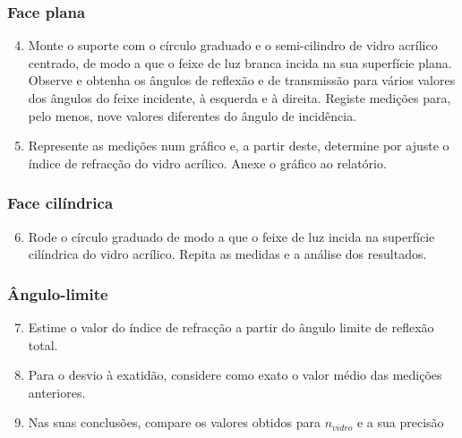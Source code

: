 \documentclass[a4paper,twoside,11pt]{report}      %
\begin{document}
\subsubsection*{\sf Face plana}
\begin{enumerate}
 \setcounter{enumi}{3}
\item Monte o suporte com o círculo graduado e o semi-cilindro  de  vidro  acrílico centrado, de modo a que o feixe de luz branca incida na sua superfície  plana.  Observe  e obtenha os ângulos de reflexão e de transmissão para vários valores dos ângulos do feixe incidente, à esquerda e à direita.  Registe medições  para, pelo  menos,  nove  valores  diferentes  do ângulo de incidência.
\item Represente as medições num gráfico e, a partir deste, determine por ajuste o índice de refracção do vidro acrílico.  Anexe o gráfico ao relatório.
\end{enumerate}

\subsubsection*{\sf Face cilíndrica}
\begin{enumerate}
 \setcounter{enumi}{5}
\item Rode o círculo graduado de modo a que o feixe de luz incida na  superfície cilíndrica do vidro acrílico. Repita  as  medidas  e  a  análise  dos  resultados. 
\end{enumerate}

\subsubsection*{\sf Ângulo-limite}
\begin{enumerate}
 \setcounter{enumi}{6}
 \item Estime o valor do índice de refracção a partir do ângulo limite de reflexão total. 
\item  Para o desvio à exatidão, considere como exato o valor médio das medições anteriores. 
\item Nas suas conclusões, compare os valores obtidos  para $n_{vidro}$ e a sua precisão 

\end{enumerate}

\end{document}
